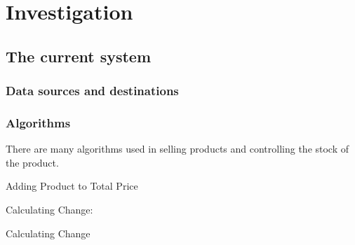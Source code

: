 \section{Investigation}


\subsection{The current system}

\subsubsection{Data sources and destinations}

\subsubsection{Algorithms}

	\begin{flushleft}
There are many algorithms used in selling products and controlling the stock of the product. \par

	\end{flushleft}

\begin{algorithm}[H]
\label{fig:repeat_pseudo_example}
	\caption{Adding Product to Total Price}
\begin{algorithmic}[1]
\EndIf
\EndWhile
\end{algorithmic}
\end{algorithm}


          \begin{flushleft}
Calculating Change:
	\end{flushleft}	
	
\begin{algorithm}[H]
	\caption{Calculating Change}
\begin{algorithmic}[1]
\EndIf

\end{algorithmic}
\end{algorithm}																														
																										


